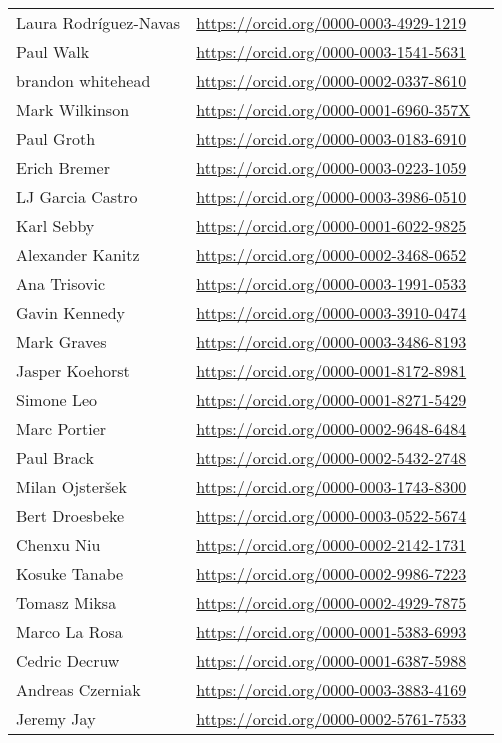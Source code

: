 \begin{longtable}{lll}
\\
  Laura Rodríguez-Navas & \url{https://orcid.org/0000-0003-4929-1219}
\\
  Paul Walk & \url{https://orcid.org/0000-0003-1541-5631}
\\
  brandon whitehead & \url{https://orcid.org/0000-0002-0337-8610}
\\
  Mark Wilkinson & \url{https://orcid.org/0000-0001-6960-357X}
\\
  Paul Groth & \url{https://orcid.org/0000-0003-0183-6910}
\\
  Erich Bremer & \url{https://orcid.org/0000-0003-0223-1059}
\\
  LJ Garcia Castro & \url{https://orcid.org/0000-0003-3986-0510}
\\
  Karl Sebby & \url{https://orcid.org/0000-0001-6022-9825}
\\
  Alexander Kanitz & \url{https://orcid.org/0000-0002-3468-0652}
\\
  Ana Trisovic & \url{https://orcid.org/0000-0003-1991-0533}
\\
  Gavin Kennedy & \url{https://orcid.org/0000-0003-3910-0474}
\\
  Mark Graves & \url{https://orcid.org/0000-0003-3486-8193}
\\
  Jasper Koehorst & \url{https://orcid.org/0000-0001-8172-8981}
\\
  Simone Leo & \url{https://orcid.org/0000-0001-8271-5429}
\\
  Marc Portier & \url{https://orcid.org/0000-0002-9648-6484}
\\
  Paul Brack & \url{https://orcid.org/0000-0002-5432-2748}
\\
  Milan Ojsteršek & \url{https://orcid.org/0000-0003-1743-8300}
\\
  Bert Droesbeke & \url{https://orcid.org/0000-0003-0522-5674}
\\
  Chenxu Niu & \url{https://orcid.org/0000-0002-2142-1731}
\\
  Kosuke Tanabe & \url{https://orcid.org/0000-0002-9986-7223}
\\
  Tomasz Miksa & \url{https://orcid.org/0000-0002-4929-7875}
\\
  Marco La Rosa & \url{https://orcid.org/0000-0001-5383-6993}
\\
  Cedric Decruw & \url{https://orcid.org/0000-0001-6387-5988}
\\
  Andreas Czerniak & \url{https://orcid.org/0000-0003-3883-4169}
\\
  Jeremy Jay & \url{https://orcid.org/0000-0002-5761-7533}

\end{longtable}
